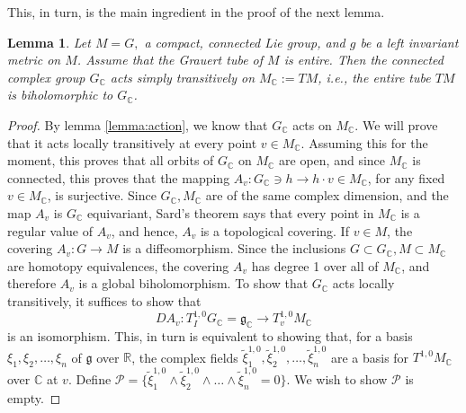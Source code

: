 \documentclass[12pt,reqno]{amsart}\usepackage{amssymb,amsmath,amscd,epsfig,amsthm,enumerate,import,eufrak}
\newtheorem{lemma}[theorem]{Lemma}
\theoremstyle{definition}
\theoremstyle{remark}
\numberwithin{equation}{section}
\theoremstyle{plain}
\theoremstyle{definition}
\def \r {\mathbb{R}}
\def \c {\mathbb{C}}
\def \mcp {\mathcal{P}}
\def \vs {\vskip 2mm}
\theoremstyle{remark}
\numberwithin{theorem}{section}
\begin{document}
This, in turn, is the main ingredient in the proof of the next lemma.

\vs
%
\begin{lemma} \label{lem:homogeneity}
	Let $M = G,$ a compact, connected Lie group, and $g$ be a left invariant metric on $M$. Assume that the Grauert tube of $M$ is entire. Then the 	connected complex group $G_{\c}$ acts simply transitively on $M_{\c} := TM$, i.e., the entire tube $TM$ is biholomorphic to $G_{\c}$.
	\end{lemma}
\vs
%
\begin{proof}
By lemma \ref{lemma:action}, we know that $G_{\c}$ acts on $M_{\c}$. We will prove that it acts locally transitively at every point $v \in M_{\c}$. Assuming this for the moment, this proves that all orbits of $G_{\c}$ on $M_{\c}$ are open, and since $M_{\c}$ is connected, this proves that the mapping $A_v: G_{\c} \ni h \to h\cdot v \in M_{\c}$, for any fixed $v \in M_{\c}$, is surjective. Since $G_{\c}, M_{\c}$ are of the same complex dimension, and the map $A_v$ is $G_{\c}$ equivariant, Sard's theorem says that every point in $M_{\c}$ is a regular value of $A_v$, and hence, $A_v$ is a topological covering. If $v \in M$, the covering $A_v: G \to M$ is a diffeomorphism. Since the inclusions $G \subset G_{\c}, M \subset M_{\c}$ are homotopy equivalences, the covering $A_v$ has degree 1 over all of $M_{\c}$, and therefore $A_v$ is a global biholomorphism.
\vs
\vs
To show that $G_{\c}$ acts locally transitively, it suffices to show that 
%
\[
	DA_{v}: T^{1,0}_{I} G_{\c} = \mathfrak{g}_{\c} \to T_v^{1,0} M_{\c}
\]
%
is an isomorphism. This, in turn is equivalent to showing that, for a basis $\xi_1, \xi_2,\ldots, \xi_n$ of $\mathfrak{g}$ over $\r$, the complex fields $\tilde{\xi}^{1,0}_1, \tilde{\xi}^{1,0}_2, \ldots, \tilde{\xi}^{1,0}_n$ are a basis for $T^{1,0}M_{\c}$ over $\c$ at $v$. Define $\mcp = \{ \tilde{\xi}^{1,0}_1 \wedge \tilde{\xi}^{1,0}_2 \wedge \ldots \wedge \tilde{\xi}^{1,0}_n = 0\}$. We wish to show $\mcp$ is empty. 
%
\vs
%

\end{proof}
\end{document}
